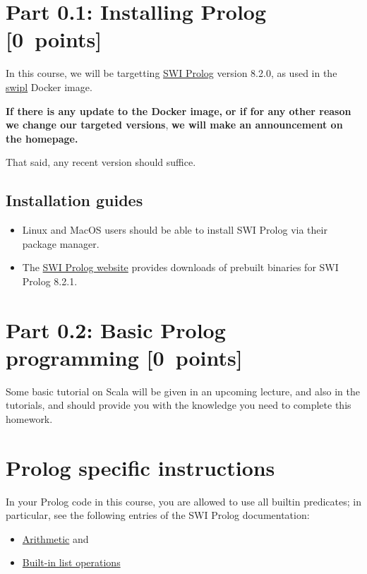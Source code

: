 \documentclass[11pt]{article}
\begin{document}
\section*{Part 0.1: Installing Prolog                            [0 points]}
\label{sec:orge4df6a9}
In this course, we will be targetting
\href{https://www.swi-prolog.org/}{SWI Prolog} version 8.2.0,
as used in the
\href{https://hub.docker.com/\_/swipl/}{swipl}
Docker image.

\begin{center}
\textbf{If there is any update to the Docker image,}
\textbf{or if for any other reason we change our targeted versions},
\textbf{we will make an announcement on the homepage.}
\end{center}

That said, any recent version should suffice. 

\subsection*{Installation guides}
\label{sec:org4a2f546}
\begin{itemize}
\item Linux and MacOS users should be able to install SWI Prolog
via their package manager.
\item The \href{https://www.swi-prolog.org/download/stable}{SWI Prolog website}
provides downloads of prebuilt binaries for SWI Prolog 8.2.1.
\end{itemize}

\section*{Part 0.2: Basic Prolog programming                     [0 points]}
\label{sec:org0acf859}
Some basic tutorial on Scala will be given
in an upcoming lecture, and also in the tutorials,
and should provide you with the knowledge you need
to complete this homework.

\section*{Prolog specific instructions}
\label{sec:orged00c00}
In your Prolog code in this course,
you are allowed to use all builtin predicates;
in particular, see the following entries of the
SWI Prolog documentation:
\begin{itemize}
\item \href{https://www.swi-prolog.org/pldoc/man?section=arith}{Arithmetic} and
\item \href{https://www.swi-prolog.org/pldoc/man?section=builtinlist}{Built-in list operations}
\end{itemize}
\end{document}
